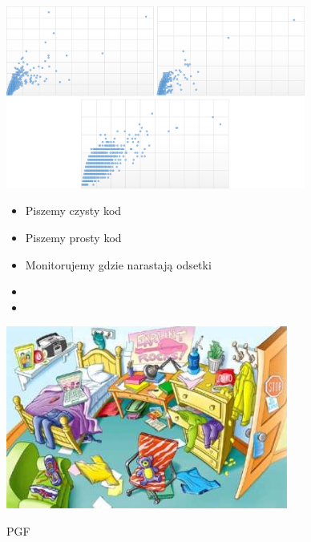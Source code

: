 \documentclass{beamer}
\begin{document}
\begin{frame}{}
\begin{center}
  	\includegraphics[height=6cm]{git_advanced.png}
\end{center}
\end{frame}

\begin{frame}{}
     \begin{Large}
	\begin{itemize}
		\item Piszemy czysty kod
		\item Piszemy prosty kod
		\item Monitorujemy gdzie narastają odsetki
		\item 
		\item 
	\end{itemize}
     \end{Large}
\end{frame}

\begin{frame}{}
\begin{center}
  	\includegraphics[height=6cm]{mess.jpeg}
\end{center}
\end{frame}

\begin{frame}{}
\begin{center}
\Huge{PGF}
\end{center}
\end{frame}
\end{document}
